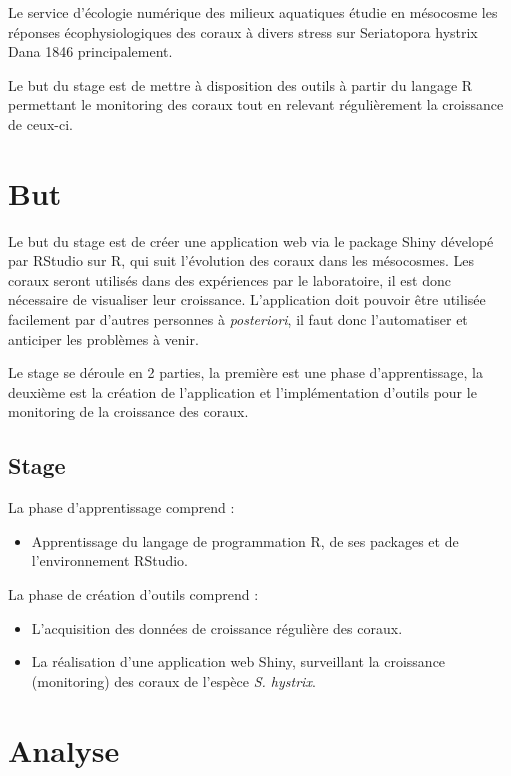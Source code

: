 \documentclass[]{report}
\providecommand{\tightlist}{%
  \setlength{\itemsep}{0pt}\setlength{\parskip}{0pt}}
\begin{document}
Le service d'écologie numérique des milieux aquatiques étudie en
mésocosme les réponses écophysiologiques des coraux à divers stress sur
Seriatopora hystrix Dana 1846 principalement.

Le but du stage est de mettre à disposition des outils à partir du
langage R permettant le monitoring des coraux tout en relevant
régulièrement la croissance de ceux-ci.

\chapter{But}\label{but}

Le but du stage est de créer une application web via le package Shiny
dévelopé par RStudio sur R, qui suit l'évolution des coraux dans les
mésocosmes. Les coraux seront utilisés dans des expériences par le
laboratoire, il est donc nécessaire de visualiser leur croissance.
L'application doit pouvoir être utilisée facilement par d'autres
personnes à \emph{posteriori}, il faut donc l'automatiser et anticiper
les problèmes à venir.

Le stage se déroule en 2 parties, la première est une phase
d'apprentissage, la deuxième est la création de l'application et
l'implémentation d'outils pour le monitoring de la croissance des
coraux.

\section{Stage}\label{stage}

La phase d'apprentissage comprend :

\begin{itemize}
\tightlist
\item
  Apprentissage du langage de programmation R, de ses packages et de
  l'environnement RStudio.
\end{itemize}

La phase de création d'outils comprend :

\begin{itemize}
\item
  L'acquisition des données de croissance régulière des coraux.
\item
  La réalisation d'une application web Shiny, surveillant la croissance
  (monitoring) des coraux de l'espèce \emph{S. hystrix}.
\end{itemize}

\chapter{Analyse}\label{analyse}
\end{document}
